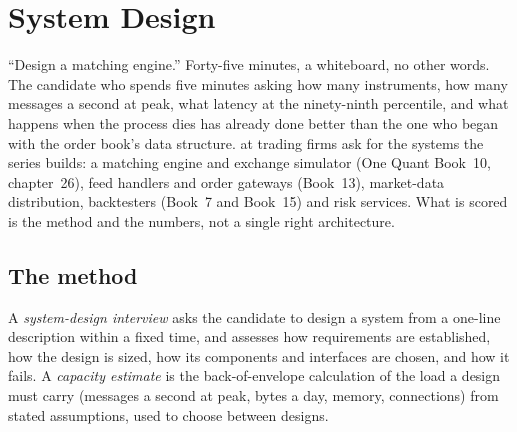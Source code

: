 \chapter{System Design}\label{ch:iv:system-design}

``Design a matching engine.'' Forty-five minutes, a whiteboard, no other words. The candidate who spends five minutes asking
how many instruments, how many messages a second at peak, what latency at the ninety-ninth percentile, and what happens when
the process dies has already done better than the one who began with the order book's data structure. 
at trading firms ask for the systems the series builds: a matching engine and exchange simulator (One Quant Book~10, chapter~26),
feed handlers and order gateways (Book~13), market-data distribution, backtesters (Book~7 and Book~15) and risk services. What is
scored is the method and the numbers, not a single right architecture.

\section{The method}

\begin{definition}\label{def:iv:system-design:interview}
A \emph{system-design interview} asks the candidate to design a system from a one-line
description within a fixed time, and assesses how requirements are established, how the design is sized, how its components
and interfaces are chosen, and how it fails. A \emph{capacity estimate} is the back-of-envelope
calculation of the load a design must carry (messages a second at peak, bytes a day, memory, connections) from stated
assumptions, used to choose between designs.
\end{definition}

